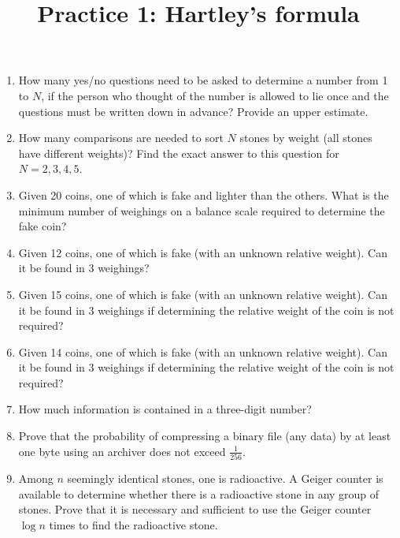\documentclass[a4paper]{article}
\title{Practice 1: Hartley's formula}
\date{\DTMdate{2024-10-09}}
\author{}
\begin{document}
\maketitle

\begin{enumerate}
  \item How many yes/no questions need to be asked to determine a number from 1 to \(N\), if the person who thought of the number is allowed to lie once and the questions must be written down in advance?
  Provide an upper estimate.

  \item How many comparisons are needed to sort \(N\) stones by weight (all stones have different weights)?
  Find the exact answer to this question for \(N = 2, 3, 4, 5\).

  \item Given 20 coins, one of which is fake and lighter than the others.
  What is the minimum number of weighings on a balance scale required to determine the fake coin?

  \item Given 12 coins, one of which is fake (with an unknown relative weight). Can it be found in 3 weighings?

  \item Given 15 coins, one of which is fake (with an unknown relative weight). Can it be found in 3 weighings if determining the relative weight of the coin is not required?

  \item Given 14 coins, one of which is fake (with an unknown relative weight). Can it be found in 3 weighings if determining the relative weight of the coin is not required?

  \item How much information is contained in a three-digit number?

  \item Prove that the probability of compressing a binary file (any data) by at least one byte using an archiver does not exceed \(\frac{1}{256}\).

  \item Among \(n\) seemingly identical stones, one is radioactive. A Geiger counter is available to determine whether there is a radioactive stone in any group of stones. Prove that it is necessary and sufficient to use the Geiger counter \(\log n\) times to find the radioactive stone.

\end{enumerate}
\end{document}
